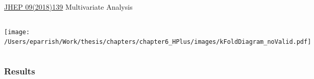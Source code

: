 \documentclass[aspectratio=169,xcolor=table]{beamer}
\begin{document}
\begin{frame}[t]{\href{https://link.springer.com/article/10.1007/JHEP09(2018)139}{JHEP 09(2018)139} Multivariate Analysis}
\begin{columns}[t]
      \vspace{3mm}
      \texttt{[image: /Users/eparrish/Work/thesis/chapters/chapter6\_HPlus/images/kFoldDiagram\_noValid.pdf]}
      \begin{table}
      \end{table}
      \end{columns}
    \end{frame} 


  \subsubsection{Results}
\end{document}
